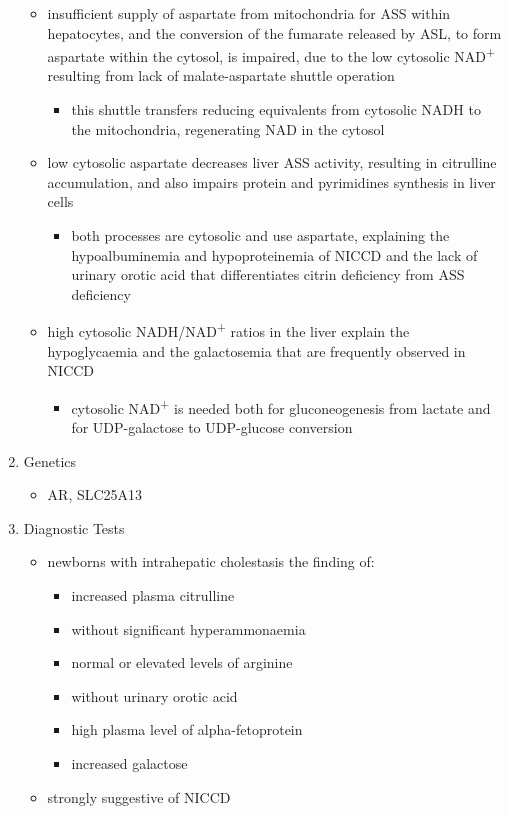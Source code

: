 \documentclass{scrartcl}
\begin{document}
\begin{enumerate}
\begin{itemize}
\item insufficient supply of aspartate from mitochondria for ASS within
hepatocytes, and the conversion of the fumarate released by ASL, to
form aspartate within the cytosol, is impaired, due to the low
cytosolic NAD\textsuperscript{+} resulting from lack of malate-aspartate shuttle
operation
\begin{itemize}
\item this shuttle transfers reducing equivalents from cytosolic NADH
to the mitochondria, regenerating NAD in the cytosol
\end{itemize}
\item low cytosolic aspartate decreases liver ASS activity, resulting in
citrulline accumulation, and also impairs protein and pyrimidines
synthesis in liver cells
\begin{itemize}
\item both processes are cytosolic and use aspartate, explaining the
hypoalbuminemia and hypoproteinemia of NICCD and the lack of
urinary orotic acid that differentiates citrin deficiency from
ASS deficiency
\end{itemize}
\item high cytosolic NADH/NAD\textsuperscript{+} ratios in the liver explain the
hypoglycaemia and the galactosemia that are frequently observed in
NICCD
\begin{itemize}
\item cytosolic NAD\textsuperscript{+} is needed both for gluconeogenesis from lactate and
for UDP-galactose to UDP-glucose conversion
\end{itemize}
\end{itemize}

\item Genetics
\label{sec:orga3ac970}
\begin{itemize}
\item AR, SLC25A13
\end{itemize}

\item Diagnostic Tests
\label{sec:org995e814}
\begin{itemize}
\item newborns with intrahepatic cholestasis the finding of:
\begin{itemize}
\item increased plasma citrulline
\item without significant hyperammonaemia
\item normal or elevated levels of arginine
\item without urinary orotic acid
\item high plasma level of alpha-fetoprotein
\item \textpm{} increased galactose
\end{itemize}
\item strongly suggestive of  NICCD
\end{itemize}


\end{enumerate}
\end{document}

